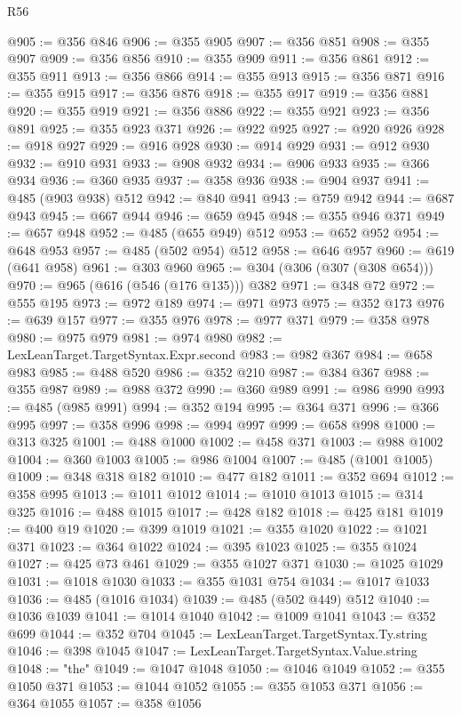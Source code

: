 \begin{lexlean}{R56}
\begin{coremodule}
@905 := @356 @846
@906 := @355 @905
@907 := @356 @851
@908 := @355 @907
@909 := @356 @856
@910 := @355 @909
@911 := @356 @861
@912 := @355 @911
@913 := @356 @866
@914 := @355 @913
@915 := @356 @871
@916 := @355 @915
@917 := @356 @876
@918 := @355 @917
@919 := @356 @881
@920 := @355 @919
@921 := @356 @886
@922 := @355 @921
@923 := @356 @891
@925 := @355 @923 @371
@926 := @922 @925
@927 := @920 @926
@928 := @918 @927
@929 := @916 @928
@930 := @914 @929
@931 := @912 @930
@932 := @910 @931
@933 := @908 @932
@934 := @906 @933
@935 := @366 @934
@936 := @360 @935
@937 := @358 @936
@938 := @904 @937
@941 := @485 (@903 @938) @512
@942 := @840 @941
@943 := @759 @942
@944 := @687 @943
@945 := @667 @944
@946 := @659 @945
@948 := @355 @946 @371
@949 := @657 @948
@952 := @485 (@655 @949) @512
@953 := @652 @952
@954 := @648 @953
@957 := @485 (@502 @954) @512
@958 := @646 @957
@960 := @619 (@641 @958)
@961 := @303 @960
@965 := @304 (@306 (@307 (@308 @654)))
@970 := @965 (@616 (@546 (@176 @135))) @382
@971 := @348 @72
@972 := @555 @195
@973 := @972 @189
@974 := @971 @973
@975 := @352 @173
@976 := @639 @157
@977 := @355 @976
@978 := @977 @371
@979 := @358 @978
@980 := @975 @979
@981 := @974 @980
@982 := LexLeanTarget.TargetSyntax.Expr.second
@983 := @982 @367
@984 := @658 @983
@985 := @488 @520
@986 := @352 @210
@987 := @384 @367
@988 := @355 @987
@989 := @988 @372
@990 := @360 @989
@991 := @986 @990
@993 := @485 (@985 @991)
@994 := @352 @194
@995 := @364 @371
@996 := @366 @995
@997 := @358 @996
@998 := @994 @997
@999 := @658 @998
@1000 := @313 @325
@1001 := @488 @1000
@1002 := @458 @371
@1003 := @988 @1002
@1004 := @360 @1003
@1005 := @986 @1004
@1007 := @485 (@1001 @1005)
@1009 := @348 @318 @182
@1010 := @477 @182
@1011 := @352 @694
@1012 := @358 @995
@1013 := @1011 @1012
@1014 := @1010 @1013
@1015 := @314 @325
@1016 := @488 @1015
@1017 := @428 @182
@1018 := @425 @181
@1019 := @400 @19
@1020 := @399 @1019
@1021 := @355 @1020
@1022 := @1021 @371
@1023 := @364 @1022
@1024 := @395 @1023
@1025 := @355 @1024
@1027 := @425 @73 @461
@1029 := @355 @1027 @371
@1030 := @1025 @1029
@1031 := @1018 @1030
@1033 := @355 @1031 @754
@1034 := @1017 @1033
@1036 := @485 (@1016 @1034)
@1039 := @485 (@502 @449) @512
@1040 := @1036 @1039
@1041 := @1014 @1040
@1042 := @1009 @1041
@1043 := @352 @699
@1044 := @352 @704
@1045 := LexLeanTarget.TargetSyntax.Ty.string
@1046 := @398 @1045
@1047 := LexLeanTarget.TargetSyntax.Value.string
@1048 := "the"
@1049 := @1047 @1048
@1050 := @1046 @1049
@1052 := @355 @1050 @371
@1053 := @1044 @1052
@1055 := @355 @1053 @371
@1056 := @364 @1055
@1057 := @358 @1056

\end{coremodule}
\end{lexlean}

